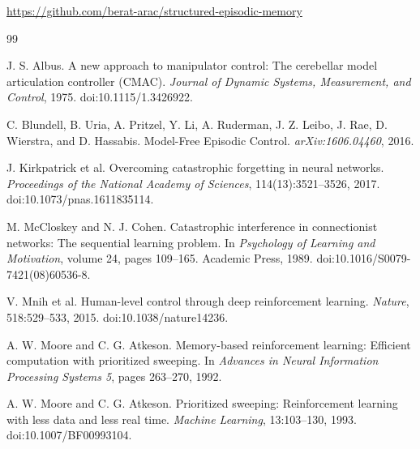 \documentclass[10pt,twocolumn]{article}
\begin{document}
\begin{center}
\url{https://github.com/berat-arac/structured-episodic-memory}
\end{center}

\begin{thebibliography}{99}

J. S. Albus.
\newblock A new approach to manipulator control: The cerebellar model articulation controller (CMAC).
\newblock \emph{Journal of Dynamic Systems, Measurement, and Control}, 1975.
\newblock doi:10.1115/1.3426922.

C. Blundell, B. Uria, A. Pritzel, Y. Li, A. Ruderman, J. Z. Leibo, J. Rae, D. Wierstra, and D. Hassabis.
\newblock Model-Free Episodic Control.
\newblock \emph{arXiv:1606.04460}, 2016.

J. Kirkpatrick et al.
\newblock Overcoming catastrophic forgetting in neural networks.
\newblock \emph{Proceedings of the National Academy of Sciences}, 114(13):3521--3526, 2017.
\newblock doi:10.1073/pnas.1611835114.

M. McCloskey and N. J. Cohen.
\newblock Catastrophic interference in connectionist networks: The sequential learning problem.
\newblock In \emph{Psychology of Learning and Motivation}, volume 24, pages 109--165. Academic Press, 1989.
\newblock doi:10.1016/S0079-7421(08)60536-8.

V. Mnih et al.
\newblock Human-level control through deep reinforcement learning.
\newblock \emph{Nature}, 518:529--533, 2015.
\newblock doi:10.1038/nature14236.


A. W. Moore and C. G. Atkeson.
\newblock Memory-based reinforcement learning: Efficient computation with prioritized sweeping.
\newblock In \emph{Advances in Neural Information Processing Systems 5}, pages 263--270, 1992.

A. W. Moore and C. G. Atkeson.
\newblock Prioritized sweeping: Reinforcement learning with less data and less real time.
\newblock \emph{Machine Learning}, 13:103--130, 1993.
\newblock doi:10.1007/BF00993104.


\end{thebibliography}
\end{document}

